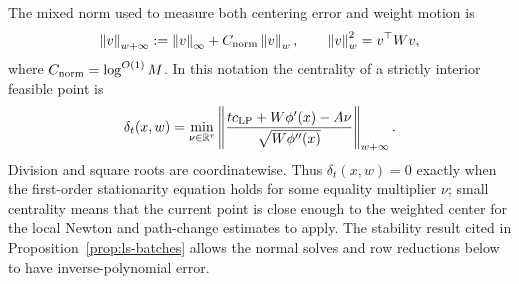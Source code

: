 \documentclass[11pt]{article}
\theoremstyle{definition}
\newcommand{\R}{\mathbb{R}}
\newcommand{\norm}[1]{\left\lVert #1\right\rVert}
\newcommand{\defeq}{\mathrel{:=}}
\begin{document}
The mixed norm used to measure both centering error and weight motion is
\[
 \norm{v}_{w+\infty}
   \defeq \norm{v}_\infty+C_{\rm norm}\norm{v}_w,
 \qquad
 \norm{v}_w^2=v^\top Wv,
\]
where $C_{\rm norm}=\log^{O(1)}M$.  In this notation the centrality of a
strictly interior feasible point is
\begin{equation}\label{eq:centrality-primer}
 \delta_t(x,w)=
 \min_{\nu\in\R^r}
 \norm{
   \frac{t c_{\rm LP}+W\phi'(x)-A\nu}
        {\sqrt{W\phi''(x)}}
 }_{w+\infty}.
\end{equation}
Division and square roots are coordinatewise.  Thus $\delta_t(x,w)=0$ exactly
when the first-order stationarity equation holds for some equality multiplier
$\nu$; small centrality means that the current point is close enough to the
weighted center for the local Newton and path-change estimates to apply.
The stability result cited in Proposition~\ref{prop:ls-batches} allows the
normal solves and row reductions below to have inverse-polynomial error.
\end{document}
